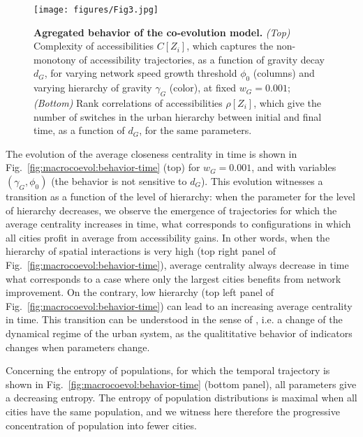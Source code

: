 \documentclass[11pt]{article}
\begin{document}
\begin{figure}
\texttt{[image: figures/Fig3.jpg]}
\caption{\textbf{Agregated behavior of the co-evolution model.} \textit{(Top)} Complexity of accessibilities $C\left[Z_i \right]$, which captures the non-monotony of accessibility trajectories, as a function of gravity decay $d_G$, for varying network speed growth threshold $\phi_0$ (columns) and varying hierarchy of gravity $\gamma_G$ (color), at fixed $w_G = 0.001$; \textit{(Bottom)} Rank correlations of accessibilities $\rho \left[ Z_i\right]$, which give the number of switches in the urban hierarchy between initial and final time, as a function of $d_G$, for the same parameters.\label{fig:macrocoevol:behavior-aggreg}}
\end{figure}


The evolution of the average closeness centrality in time is shown in Fig.~\ref{fig:macrocoevol:behavior-time} (top) for $w_G = 0.001$, and with variables $(\gamma_G,\phi_0)$ (the behavior is not sensitive to $d_G$). This evolution witnesses a transition as a function of the level of hierarchy: when the parameter for the level of hierarchy decreases, we observe the emergence of trajectories for which the average centrality increases in time, what corresponds to configurations in which all cities profit in average from accessibility gains. In other words, when the hierarchy of spatial interactions is very high (top right panel of Fig.~\ref{fig:macrocoevol:behavior-time}), average centrality always decrease in time what corresponds to a case where only the largest cities benefits from network improvement. On the contrary, low hierarchy (top left panel of Fig.~\ref{fig:macrocoevol:behavior-time}) can lead to an increasing average centrality in time. This transition can be understood in the sense of \cite{sanders2017peupler}, i.e. a change of the dynamical regime of the urban system, as the qualititative behavior of indicators changes when parameters change.


Concerning the entropy of populations, for which the temporal trajectory is shown in Fig.~\ref{fig:macrocoevol:behavior-time} (bottom panel), all parameters give a decreasing entropy. The entropy of population distributions is maximal when all cities have the same population, and we witness here therefore the progressive concentration of population into fewer cities.
\end{document}
